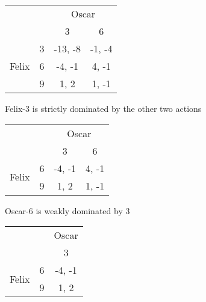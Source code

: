 \documentclass[12pt]{amsart}
\begin{document}
	\begin{center}
		\def\arraystretch{1.25}%
		\begin{tabular}{cccc}
			&                        & \multicolumn{2}{c}{Oscar}                                  \\
			& \multicolumn{1}{c|}{}  & \multicolumn{1}{c|}{3}       & \multicolumn{1}{c|}{6}      \\ \cline{2-4} 
			\multirow{3}{*}{Felix} & \multicolumn{1}{c|}{3} & \multicolumn{1}{c|}{-13, -8} & \multicolumn{1}{c|}{-1, -4} \\ \cline{2-4} 
			& \multicolumn{1}{c|}{6} & \multicolumn{1}{c|}{-4, -1}  & \multicolumn{1}{c|}{4, -1}  \\ \cline{2-4} 
			& \multicolumn{1}{c|}{9} & \multicolumn{1}{c|}{1, 2}    & \multicolumn{1}{c|}{1, -1}  \\ \cline{2-4} 
		\end{tabular}
	\end{center}
	
	Felix-3 is strictly dominated by the other two actions
	
	\begin{center}
		\def\arraystretch{1.25}%
		\begin{tabular}{cccc}
			&                        & \multicolumn{2}{c}{Oscar}                                \\
			& \multicolumn{1}{c|}{}  & \multicolumn{1}{c|}{3}      & \multicolumn{1}{c|}{6}     \\ \cline{2-4} 
			\multirow{2}{*}{Felix} & \multicolumn{1}{c|}{6} & \multicolumn{1}{c|}{-4, -1} & \multicolumn{1}{c|}{4, -1} \\ \cline{2-4} 
			& \multicolumn{1}{c|}{9} & \multicolumn{1}{c|}{1, 2}   & \multicolumn{1}{c|}{1, -1} \\ \cline{2-4} 
		\end{tabular}
	\end{center}
	
	Oscar-6 is weakly dominated by 3
	
	\begin{center}
		\def\arraystretch{1.25}%
		\begin{tabular}{ccc}
			&                        & Oscar                       \\
			& \multicolumn{1}{c|}{}  & \multicolumn{1}{c|}{3}      \\ \cline{2-3} 
			\multirow{2}{*}{Felix} & \multicolumn{1}{c|}{6} & \multicolumn{1}{c|}{-4, -1} \\ \cline{2-3} 
			& \multicolumn{1}{c|}{9} & \multicolumn{1}{c|}{1, 2}   \\ \cline{2-3} 
		\end{tabular} \\[2ex]
	\end{center}
\end{document}
